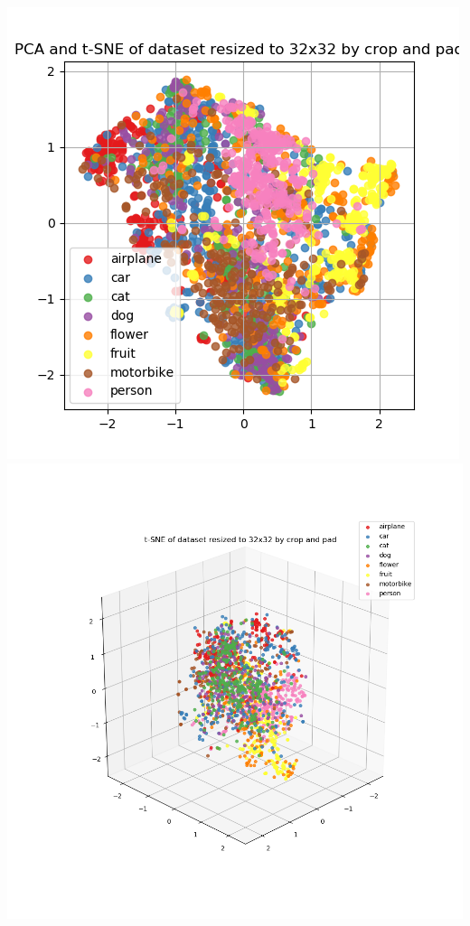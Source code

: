 \documentclass{article}
\begin{document}
\begin{minipage}[c]{\linewidth}
	\includegraphics[width= \figureWidth\textwidth]{./figures/pca_tsne_h32_w32_cp_none.png}
	\includegraphics[width= \figureWidth\textwidth]{./figures/tsne_h32_w32_cp_none.png}
	

\end{minipage}
\end{document}
